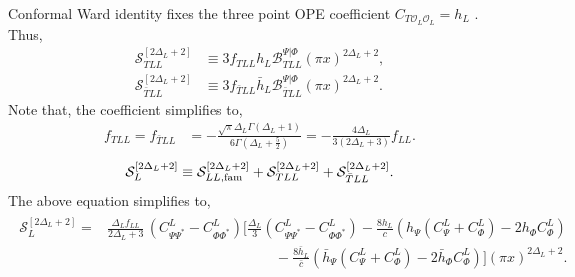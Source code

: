 \documentclass[11pt]{article}
\newcommand{\mO}{\mathcal{O}}
\newcommand{\lb}{\left(}
\newcommand{\rb}{\right)}
\begin{document}
Conformal Ward identity fixes the three point OPE coefficient $C_{T\mO_L\mO_L} = h_L$ \cite{yellowbook}. Thus,
\begin{align}
    \mathcal S_{TLL}^{[2\Delta_L+2]}
    &\equiv
    3
    f_{TLL}h_L
    \mathcal B_{TLL}^{\Psi|\Phi}
    (\pi x)^{2\Delta_L+2},
    \\
    \mathcal S_{\bar TLL}^{[2\Delta_L+2]}
    &\equiv
    3
    f_{\bar TLL}\bar h_L
    \mathcal B_{\bar TLL}^{\Psi|\Phi}
    (\pi x)^{2\Delta_L+2}.
\end{align}
Note that, the coefficient simplifies to,
\begin{align}
    f_{TLL} = f_{\bar TLL}
    &=
    -\frac{\sqrt{\pi}\Delta_L\Gamma(\Delta_L+1)}
    {6\Gamma\lb\Delta_L+\frac52\rb}
    =
    -\frac{4\Delta_L}
    {3(2\Delta_L+3)}f_{LL}.
\end{align}
\begin{align}
    \mathcal S_L^{[2\Delta_L+2]}
    \equiv
    \mathcal S_{LL,{\rm fam}}^{[2\Delta_L+2]}
    +
    \mathcal S_{TLL}^{[2\Delta_L+2]}
    +
    \mathcal S_{\bar TLL}^{[2\Delta_L+2]} .
\end{align}
The above equation simplifies to,
\begin{align}
\begin{aligned}
\mathcal S_L^{[2\Delta_L+2]}
={}&
\frac{\Delta_L f_{LL}}
{2\Delta_L+3}
\,(C^L_{\Psi\Psi^*}-C^L_{\Phi\Phi^*})
\Bigg[
\frac{\Delta_L}{3}(C^L_{\Psi\Psi^*}-C^L_{\Phi\Phi^*})
-\frac{8h_L}{c}
\left(
h_\Psi(C_\Psi^L+C_\Phi^L)
-2h_\Phi C_\Phi^L
\right)
\\
&\qquad \qquad\qquad\qquad\qquad\qquad
-\frac{8\bar h_L}{\bar c}
\left(
\bar h_\Psi(C_\Psi^L+C_\Phi^L)
-2\bar h_\Phi C_\Phi^L
\right)
\Bigg]
(\pi x)^{2\Delta_L+2}.
\end{aligned}
\end{align}
\end{document}
